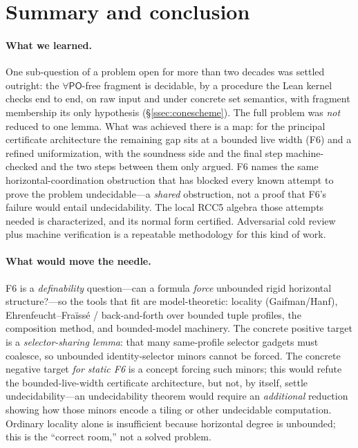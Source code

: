 \documentclass[11pt]{article}
\newcommand{\PO}{\mathsf{PO}}
\theoremstyle{plain}
\theoremstyle{definition}
\begin{document}
\section{Summary and conclusion}
\label{sec:conclusion}

\paragraph{What we learned.} One sub-question of a problem open for more
than two decades was settled outright: the $\forall\PO$-free fragment is
decidable, by a procedure the Lean kernel checks end to end, on raw input and
under concrete set semantics, with fragment membership its only hypothesis
(\S\ref{ssec:conescheme}). The full problem was \emph{not} reduced to one
lemma. What was achieved there is a map: for the principal certificate
architecture the remaining gap sits at a bounded live width (F6) and a refined
uniformization, with the soundness side and the final step machine-checked and
the two steps between them only argued. F6 names the same
horizontal-coordination obstruction that has blocked every known attempt to
prove the problem undecidable---a \emph{shared} obstruction, not a proof that
F6's failure would entail undecidability. The local RCC5 algebra those
attempts needed is characterized, and its normal form certified. Adversarial
cold review plus machine verification is a repeatable methodology for this
kind of work.

\paragraph{What would move the needle.} F6 is a \emph{definability}
question---can a formula \emph{force} unbounded rigid horizontal
structure?---so the tools that fit are model-theoretic: locality
(Gaifman/Hanf), Ehrenfeucht--Fra\"iss\'e / back-and-forth over bounded
tuple profiles, the composition method, and bounded-model machinery. The
concrete positive target is a \emph{selector-sharing lemma}: that many
same-profile selector gadgets must coalesce, so unbounded
identity-selector minors cannot be forced. The concrete negative target
\emph{for static F6} is a concept forcing such minors; this would refute
the bounded-live-width certificate architecture, but not, by itself,
settle undecidability---an undecidability theorem would require an
\emph{additional} reduction showing how those minors encode a tiling or
other undecidable computation.
Ordinary locality alone is insufficient because horizontal degree is
unbounded; this is the ``correct room,'' not a solved problem.
\end{document}
